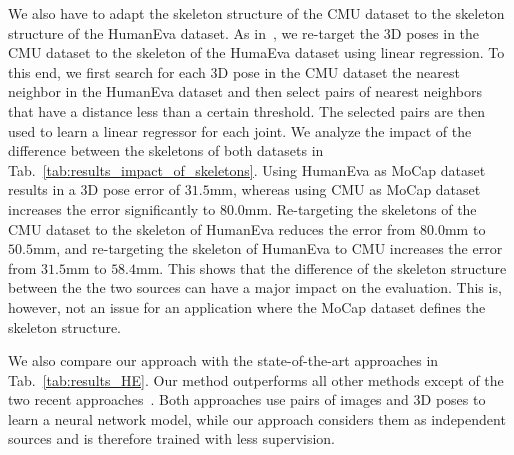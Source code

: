 \documentclass[10pt,journal,compsoc]{IEEEtran}
\begin{document}
We also have to adapt the skeleton structure of the CMU dataset to the skeleton structure of the HumanEva dataset. As in~\cite{Yasin_2016_CVPR}, we re-target the 3D poses in the CMU dataset to the skeleton of the HumaEva dataset using linear regression. 
To this end, we first search for each 3D pose in the CMU dataset the nearest neighbor in the HumanEva dataset and then select pairs of nearest neighbors that have a distance less than a certain threshold. The selected pairs are then used to learn a linear regressor for each joint. We analyze the impact of the difference between the skeletons of both datasets in Tab.~\ref{tab:results_impact_of_skeletons}. 
Using HumanEva as MoCap dataset results in a 3D pose error of $31.5$mm, whereas using CMU as MoCap dataset increases the error significantly to $80.0$mm.
Re-targeting the skeletons of the CMU dataset to the skeleton of HumanEva reduces the error from $80.0$mm to $50.5$mm, and re-targeting the skeleton of HumanEva to CMU increases the 
error from $31.5$mm to $58.4$mm. This shows that the difference of the skeleton structure between the the two sources can have a major impact on the evaluation. This is, however, not an issue for an application where the MoCap dataset defines the skeleton structure.   

We also compare our approach with the state-of-the-art approaches 
\cite{Ilya_2014,Wang_2014_CVPR,Radwan-2013iccv,SimoSerraCVPR2013,SimoSerraCVPR2012,Bo-2010,Yasin_2016_CVPR,Moreno_arxiv2016} in Tab.~\ref{tab:results_HE}. 
Our method outperforms all other methods except of the two recent approaches~\cite{Moreno_arxiv2016,popa2017CVPRmultitask}. Both approaches use pairs of images and 3D poses to learn a neural network model, while our approach considers them as independent sources and is therefore trained with less supervision.     
\end{document}
